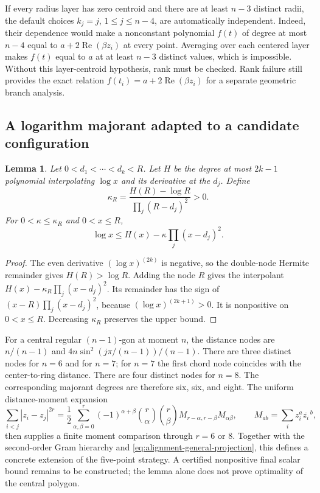 \documentclass[11pt]{article}
\newtheorem{lemma}[theorem]{Lemma}
\theoremstyle{remark}
\numberwithin{equation}{section}
\begin{document}
If every radius layer has zero centroid and there are at least
$n-3$ distinct radii, the default choices $k_j=j$, $1\le j\le n-4$,
are automatically independent. Indeed, their dependence would make
a nonconstant polynomial $f(t)$ of degree at most $n-4$ equal to
$a+2\operatorname{Re}(\beta z_i)$ at every point. Averaging over each
centered layer makes $f(t)$ equal to $a$ at at least $n-3$ distinct
values, which is impossible. Without this layer-centroid hypothesis,
rank must be checked. Rank failure still provides the exact relation
$f(t_i)=a+2\operatorname{Re}(\beta z_i)$ for a separate geometric
branch analysis.

\subsection{A logarithm majorant adapted to a candidate configuration}
\begin{lemma}\label{lem:alignment-node-majorant}
Let $0<d_1<\cdots<d_k<R$. Let $H$ be the degree at most $2k-1$
polynomial interpolating $\log x$ and its derivative at the $d_j$.
Define
\[
 \kappa_R=\frac{H(R)-\log R}{\prod_j(R-d_j)^2}>0.
\]
For $0<\kappa\le\kappa_R$ and $0<x\le R$,
\[
 \log x\le H(x)-\kappa\prod_j(x-d_j)^2.
\]
\end{lemma}
\begin{proof}
The even derivative $(\log x)^{(2k)}$ is negative, so the double-node
Hermite remainder gives $H(R)>\log R$. Adding the node $R$ gives
the interpolant $H(x)-\kappa_R\prod_j(x-d_j)^2$. Its remainder
has the sign of $(x-R)\prod_j(x-d_j)^2$, because
$(\log x)^{(2k+1)}>0$. It is nonpositive on $0<x\le R$.
Decreasing $\kappa_R$ preserves the upper bound.
\end{proof}

For a central regular $(n-1)$-gon at moment $n$, the distance nodes
are $n/(n-1)$ and
$4n\sin^2(j\pi/(n-1))/(n-1)$. There are three distinct nodes for
$n=6$ and for $n=7$; for $n=7$ the first chord node coincides with
the center-to-ring distance. There are four distinct nodes for $n=8$.
The corresponding majorant degrees are therefore six, six, and eight.
The uniform distance-moment expansion
\[
 \sum_{i<j}|z_i-z_j|^{2r}
 =\frac12\sum_{\alpha,\beta=0}^r(-1)^{\alpha+\beta}
  \binom r\alpha\binom r\beta
  M_{r-\alpha,r-\beta}M_{\alpha\beta},\qquad
  M_{ab}=\sum_i z_i^a\overline{z_i}^{\,b},
\]
then supplies a finite moment comparison through $r=6$ or $8$.
Together with the second-order Gram hierarchy and
\eqref{eq:alignment-general-projection}, this defines a concrete
extension of the five-point strategy. A certified nonpositive final
scalar bound remains to be constructed; the lemma alone does not
prove optimality of the central polygon.
\end{document}
